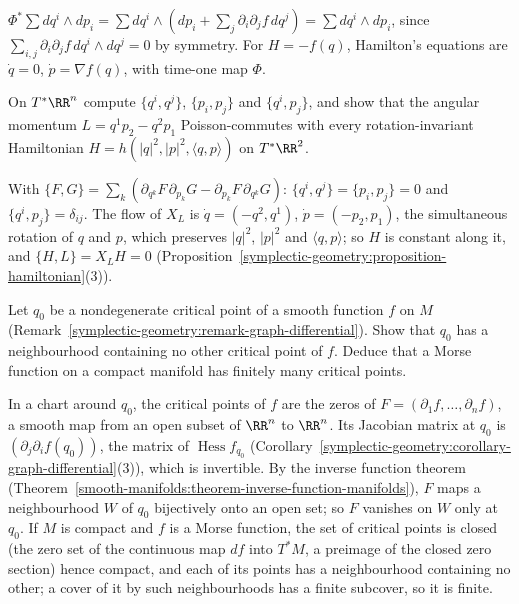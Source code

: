 \begin{solution}
$\Phi^*\sum dq^i \wedge dp_i = \sum dq^i \wedge (dp_i + \sum_j\partial_i\partial_jf\,dq^j) = \sum dq^i \wedge dp_i$, since $\sum_{i,j}\partial_i\partial_jf\,dq^i \wedge dq^j = 0$ by symmetry. For $H = -f(q)$,
Hamilton's equations are $\dot q = 0$, $\dot p = \nabla f(q)$, with time-one map $\Phi$.
\end{solution}

\begin{exercise}\label{symplectic-geometry:exercise-poisson-r2n}
On $T^*\RR^n$ compute $\{q^i, q^j\}$, $\{p_i, p_j\}$ and $\{q^i, p_j\}$, and show that the angular momentum $L = q^1p_2 - q^2p_1$ Poisson-commutes with every rotation-invariant Hamiltonian
$H = h(|q|^2, |p|^2, \langle q, p\rangle)$ on $T^*\RR^2$.
\end{exercise}

\begin{solution}
With $\{F, G\} = \sum_k(\partial_{q^k}F\,\partial_{p_k}G - \partial_{p_k}F\,\partial_{q^k}G)$: $\{q^i, q^j\} = \{p_i, p_j\} = 0$ and $\{q^i, p_j\} = \delta_{ij}$. The flow of $X_L$ is $\dot q = (-q^2, q^1)$,
$\dot p = (-p_2, p_1)$, the simultaneous rotation of $q$ and $p$, which preserves $|q|^2$, $|p|^2$ and $\langle q, p\rangle$; so $H$ is constant along it, and $\{H, L\} = X_LH = 0$
(Proposition~\ref{symplectic-geometry:proposition-hamiltonian}(3)).
\end{solution}

\begin{exercise}\label{symplectic-geometry:exercise-morse-isolated}
Let $q_0$ be a nondegenerate critical point of a smooth function $f$ on $M$ (Remark~\ref{symplectic-geometry:remark-graph-differential}). Show that $q_0$ has a neighbourhood containing no other critical
point of $f$. Deduce that a Morse function on a compact manifold has finitely many critical points.
\end{exercise}

\begin{solution}
In a chart around $q_0$, the critical points of $f$ are the zeros of $F = (\partial_1f, \ldots, \partial_nf)$, a smooth map from an open subset of $\RR^n$ to $\RR^n$. Its Jacobian matrix at $q_0$ is
$(\partial_j\partial_if(q_0))$, the matrix of $\operatorname{Hess}f_{q_0}$ (Corollary~\ref{symplectic-geometry:corollary-graph-differential}(3)), which is invertible. By the inverse function theorem
(Theorem~\ref{smooth-manifolds:theorem-inverse-function-manifolds}), $F$ maps a neighbourhood $W$ of $q_0$ bijectively onto an open set; so $F$ vanishes on $W$ only at $q_0$. If $M$ is compact and $f$ is a
Morse function, the set of critical points is closed (the zero set of the continuous map $df$ into $T^*M$, a preimage of the closed zero section) hence compact, and each of its points has a
neighbourhood containing no other; a cover of it by such neighbourhoods has a finite subcover, so it is finite.
\end{solution}


